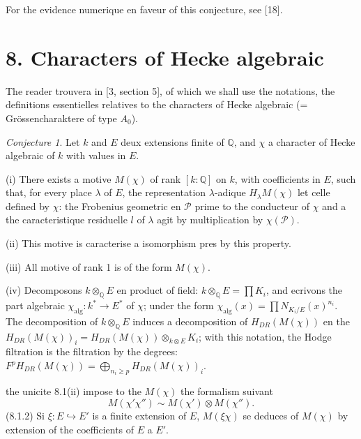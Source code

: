 \documentclass[12pt,a4paper]{article}
\theoremstyle{plain}
\theoremstyle{definition}
\theoremstyle{remark}
\newtheorem{conjecture}[definition]{Conjecture}
\newcommand{\Q}{\mathbb{Q}}
\begin{document}
For the evidence numerique en faveur of this conjecture, see [18].


\section*{8. Characters of Hecke algebraic}

The reader trouvera in [3, section 5], of which we shall use the notations, the
definitions essentielles relatives to the characters of Hecke algebraic (= Gr\"ossencharaktere
 of type $A_0$).

\begin{conjecture}\label{conj:8.1}
Let $k$ and $E$ deux extensions finite of $\Q$, and $\chi$ a character of Hecke algebraic
 of $k$ with values in $E$.

\textup{(i)} There exists a motive $M(\chi)$ of rank $[k:\Q]$ on $k$, with coefficients in $E$, such that,
for every place $\lambda$ of $E$, the representation $\lambda$-adique $H_\lambda M(\chi)$ let celle
defined by $\chi$: the Frobenius geometric en $\mathcal{P}$ prime to the conducteur of $\chi$ and a the
caracteristique residuelle $l$ of $\lambda$ agit by multiplication by $\chi(\mathcal{P})$.

\textup{(ii)} This motive is caracterise a isomorphism pres by this property.

\textup{(iii)} All motive of rank 1 is of the form $M(\chi)$.

\textup{(iv)} Decomposons $k \otimes_\Q E$ en product of field: $k \otimes_\Q E = \prod K_i$, and ecrivons the part
algebraic $\chi_{\text{alg}}: k^* \to E^*$ of $\chi$; under the form
$\chi_{\text{alg}}(x) = \prod N_{K_i/E}(x)^{n_i}$. The decomposition of $k \otimes_\Q E$ induces a decomposition
of $H_{DR}(M(\chi))$ en the $H_{DR}(M(\chi))_i = H_{DR}(M(\chi)) \otimes_{k \otimes E} K_i$;
with this notation, the Hodge filtration is the filtration by the degrees:
$F^p H_{DR}(M(\chi)) = \bigoplus_{n_i \geq p} H_{DR}(M(\chi))_i$.
\end{conjecture}


the unicite 8.1(ii) impose to the $M(\chi)$ the formalism suivant
\begin{equation}\label{eq:8.1.1}
M(\chi' \chi'') \sim M(\chi') \otimes M(\chi'').
\end{equation}
(8.1.2) Si $\xi: E \hookrightarrow E'$ is a finite extension of $E$, $M(\xi\chi)$ se deduces of $M(\chi)$
by extension of the coefficients of $E$ a $E'$.
\end{document}

